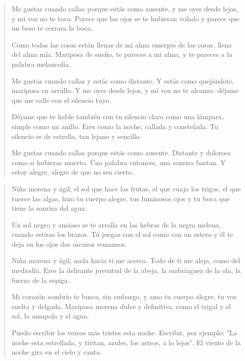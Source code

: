 \documentclass[12pt]{article}
\begin{document}
\clearpage
{}
\begin{verse}
Me gustas cuando callas porque estás como ausente,  
y me oyes desde lejos, y mi voz no te toca.  
Parece que los ojos se te hubieran volado  
y parece que un beso te cerrara la boca.  
  
Como todas las cosas están llenas de mi alma  
emerges de las cosas, llena del alma mía.  
Mariposa de sueño, te pareces a mi alma,  
y te pareces a la palabra melancolía.  
  
Me gustas cuando callas y estás como distante.  
Y estás como quejándote, mariposa en arrullo.  
Y me oyes desde lejos, y mi voz no te alcanza:  
déjame que me calle con el silencio tuyo.  
  
Déjame que te hable también con tu silencio  
claro como una lámpara, simple como un anillo.  
Eres como la noche, callada y constelada.  
Tu silencio es de estrella, tan lejano y sencillo.  
  
Me gustas cuando callas porque estás como ausente.  
Distante y dolorosa como si hubieras muerto.  
Una palabra entonces, una sonrisa bastan.  
Y estoy alegre, alegre de que no sea cierto.

\end{verse}

\clearpage
{}
\begin{verse}
Niña morena y ágil, el sol que hace las frutas,  
el que cuaja los trigos, el que tuerce las algas,  
hizo tu cuerpo alegre, tus luminosos ojos  
y tu boca que tiene la sonrisa del agua.  
  
Un sol negro y ansioso se te arrolla en las hebras  
de la negra melena, cuando estiras los brazos.  
Tú juegas con el sol como con un estero  
y él te deja en los ojos dos oscuros remansos.  
  
Niña morena y ágil, nada hacia ti me acerca.  
Todo de ti me aleja, como del mediodía.  
Eres la delirante juventud de la abeja,  
la embriaguez de la ola, la fuerza de la espiga.  
  
Mi corazón sombrío te busca, sin embargo,  
y amo tu cuerpo alegre, tu voz suelta y delgada.  
Mariposa morena dulce y definitiva,  
como el trigal y el sol, la amapola y el agua.  
   
Puedo escribir los versos más tristes esta noche.  
Escribir, por ejemplo: "La noche esta estrellada,  
y tiritan, azules, los astros, a lo lejos".  
El viento de la noche gira en el cielo y canta.

\end{verse}
\end{document}
